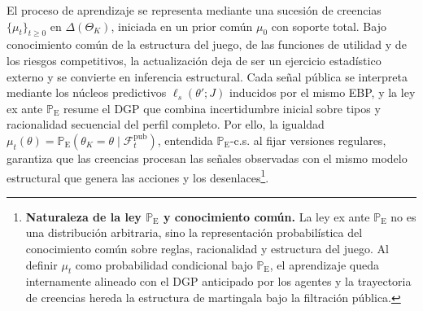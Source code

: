 \documentclass[12pt]{article}
\theoremstyle{definition}
\theoremstyle{remark}
\newcommand{\ProbE}{\mathbb{P}_{\mathrm{E}}}
\newcommand{\1}{\mathbf{1}}
\begin{document}

\noindent El proceso de aprendizaje se representa mediante una sucesión de creencias $\{\mu_t\}_{t\ge 0}$ en $\Delta(\Theta_K)$, iniciada en un prior común $\mu_0$ con soporte total. Bajo conocimiento común de la estructura del juego, de las funciones de utilidad y de los riesgos competitivos, la actualización deja de ser un ejercicio estadístico externo y se convierte en inferencia estructural. Cada señal pública se interpreta mediante los núcleos predictivos $\ell_s(\theta';J)$ inducidos por el mismo EBP, y la ley ex ante $\ProbE$ resume el DGP que combina incertidumbre inicial sobre tipos y racionalidad secuencial del perfil completo. Por ello, la igualdad $\mu_t(\theta)=\ProbE(\theta_K=\theta\mid\mathcal{F}_t^{\mathrm{pub}})$, entendida $\ProbE$-c.s. al fijar versiones regulares, garantiza que las creencias procesan las señales observadas con el mismo modelo estructural que genera las acciones y los desenlaces\footnote{%
\textbf{Naturaleza de la ley $\ProbE$ y conocimiento común.} La ley ex ante $\ProbE$ no es una distribución arbitraria, sino la representación probabilística del conocimiento común sobre reglas, racionalidad y estructura del juego. Al definir $\mu_t$ como probabilidad condicional bajo $\ProbE$, el aprendizaje queda internamente alineado con el DGP anticipado por los agentes y la trayectoria de creencias hereda la estructura de martingala bajo la filtración pública.}.




\end{document}
